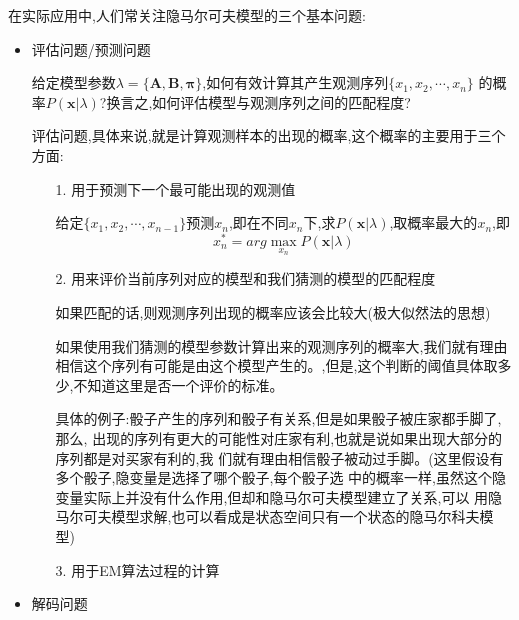 \documentclass[UTF8,a4paper]{ctexart}%
\begin{document}
            在实际应用中,人们常关注隐马尔可夫模型的三个基本问题:
            \begin{itemize}
              \item 评估问题/预测问题

                  给定模型参数$\lambda = \{\bm{A,B,\pi}\}$,如何有效计算其产生观测序列$\{x_1, x_2, \cdots , x_n\}$ 的概率$P(\bm{x} | \lambda)$?换言之,如何评估模型与观测序列之间的匹配程度?

                  {\color{blue}

                  评估问题,具体来说,就是计算观测样本的出现的概率,这个概率的主要用于三个方面:

                  \begin{itemize}
                    \item [1.] 用于预测下一个最可能出现的观测值

                          给定$\{x_1, x_2, \cdots , x_{n-1}\}$预测$x_n$,即在不同$x_n$下,求$P(\bm{x} | \lambda)$,取概率最大的$x_n$,即
                              \[ x_n^* = arg \max_{x_n} P(\bm{x} | \lambda) \]

                    \item [2.] 用来评价当前序列对应的模型和我们猜测的模型的匹配程度

                          如果匹配的话,则观测序列出现的概率应该会比较大(极大似然法的思想)

                          如果使用我们猜测的模型参数计算出来的观测序列的概率大,我们就有理由相信这个序列有可能是由这个模型产生的。{\color{red},但是,这个判断的阈值具体取多少,不知道这里是否一个评价的标准。}

                          具体的例子:骰子产生的序列和骰子有关系,但是如果骰子被庄家都手脚了,那么,
                        出现的序列有更大的可能性对庄家有利,也就是说如果出现大部分的序列都是对买家有利的,我
                        们就有理由相信骰子被动过手脚。(这里假设有多个骰子,隐变量是选择了哪个骰子,每个骰子选
                        中的概率一样,虽然这个隐变量实际上并没有什么作用,但却和隐马尔可夫模型建立了关系,可以
                        用隐马尔可夫模型求解,也可以看成是状态空间只有一个状态的隐马尔科夫模型)\\

                    \item [3.] 用于EM算法过程的计算
                  \end{itemize}
                  }

              \item 解码问题


\end{itemize}
\end{document}
